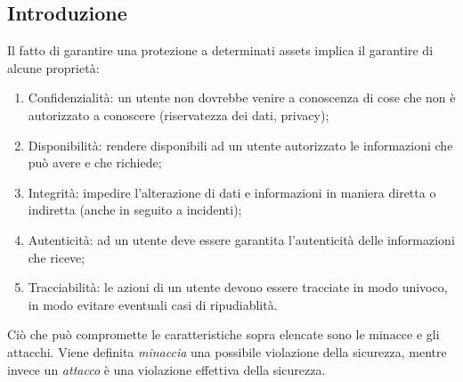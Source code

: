 \documentclass[a4paper, 11pt]{article}
\begin{document}
	\begin{frontespizio}
	\end{frontespizio}
	
	\tableofcontents
	
	\newpage
	

	\begin{multicols}{2}
		\begin{abstract}
			Questa dispensa è scritta per la parte teorica del corso di Programmazione e sicurezza di Rete. Il codice \LaTeX è disponibile a \url{https://github.com/alx79/dispense-info-univr.git}
		\end{abstract}
		\section{Introduzione}
		Il fatto di garantire una protezione a determinati assets implica il garantire di alcune proprietà:
		\begin{enumerate}
			\item Confidenzialità: un utente non dovrebbe venire a conoscenza di cose che non è autorizzato a conoscere (riservatezza dei dati, privacy);
			
			\item Disponibilità: rendere disponibili ad un utente autorizzato le informazioni che può avere e che richiede;
			
			\item Integrità: impedire l'alterazione di dati e informazioni in maniera diretta o indiretta (anche in seguito a incidenti);
			
			\item Autenticità: ad un utente deve essere garantita l'autenticità delle informazioni che riceve;
			
			\item Tracciabilità: le azioni di un utente devono essere tracciate in modo univoco, in modo evitare eventuali casi di ripudiablità.
		\end{enumerate}
		
		Ciò che può compromette le caratteristiche sopra elencate sono le minacce e gli attacchi. Viene definita \textit{minaccia} una possibile violazione della sicurezza, mentre invece un \textit{attacco} è una violazione effettiva della sicurezza.
		

\end{multicols}
\end{document}
